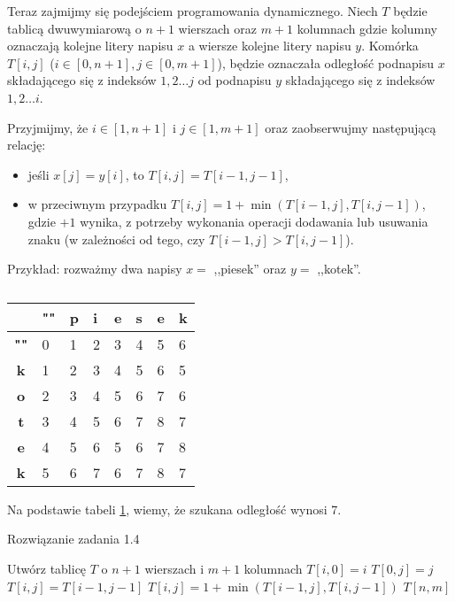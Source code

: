Teraz zajmijmy się podejściem programowania dynamicznego.
Niech $T$ będzie tablicą dwuwymiarową o
$n + 1$ wierszach oraz $m + 1$ kolumnach
gdzie kolumny oznaczają kolejne litery napisu $x$ a
wiersze kolejne litery napisu $y$. Komórka
$T[i, j]$ ($i \in [0, n+1], j \in [0, m+1]$), będzie 
oznaczała odległość 
podnapisu $x$ składającego się z indeksów $1,2 \ldots j$ od 
podnapisu $y$ składającego się z indeksów $1,2 \ldots i$.

Przyjmijmy, że $i \in [1, n+1]$ i $ j \in [1, m+1]$ oraz 
zaobserwujmy następującą relację: 
\begin{itemize}
	\item jeśli $x[j]=y[i]$, to $T[i, j] = T[i - 1, j - 1]$,
	\item w przeciwnym przypadku $T[i, j] = 1 + \min(T[i - 1, j], T[i, j - 1])$, gdzie
	$+1$ wynika, z potrzeby wykonania operacji dodawania lub usuwania znaku
	(w zależności od tego, czy $T[i - 1, j] > T[i, j - 1]$).
\end{itemize}

Przykład: rozważmy dwa napisy $x =$ ,,piesek'' oraz $y =$ ,,kotek''.

\begin{table}[H]
	\center
	\begin{tabular}{|c|lllllll|}
		\hline \diagbox{$y$}{$x$}
		& \multicolumn{1}{l|}{\textbf{""}} & \multicolumn{1}{l|}{\textbf{p}} & \multicolumn{1}{l|}{\textbf{i}} & \multicolumn{1}{l|}{\textbf{e}} & \multicolumn{1}{l|}{\textbf{s}} & \multicolumn{1}{l|}{\textbf{e}} & \multicolumn{1}{l|}{\textbf{k}} \\ \hline
		\textbf{""} & 0 & 1 & 2 & 3 & 4 & 5 & 6 \\ \cline{1-1}
		\textbf{k}  & 1 & 2 & 3 & 4 & 5 & 6 & 5 \\ \cline{1-1}
		\textbf{o}  & 2 & 3 & 4 & 5 & 6 & 7 & 6 \\ \cline{1-1}
		\textbf{t}  & 3 & 4 & 5 & 6 & 7 & 8 & 7 \\ \cline{1-1}
		\textbf{e}  & 4 & 5 & 6 & 5 & 6 & 7 & 8 \\ \cline{1-1}
		\textbf{k}  & 5 & 6 & 7 & 6 & 7 & 8 & 7 \\ \cline{1-1}
		\hline
	\end{tabular}
	\caption{}
	\label{tab_zad14}
\end{table}

Na podstawie tabeli \ref{tab_zad14}, wiemy, że szukana odległość wynosi 7.

\begin{algorithm}[H]
	\caption{Rozwiązanie zadania 1.4}
	\begin{algorithmic}[1]
		\State Utwórz tablicę $T$ o $n + 1$ wierszach i $m + 1$ kolumnach
		\State $T[i, 0] = i$
		\EndFor		
		\State $T[0, j] = j$
		\EndFor
		\State $T[i, j] = T[i - 1, j - 1]$
		\Else
		\State $T[i, j] = 1 + \min(T[i - 1, j], T[i, j - 1])$
		\EndIf
		\EndFor
		\EndFor
		\State \Return $T[n, m]$
		\EndProcedure 
	\end{algorithmic}
	\label{Zadanie14}
\end{algorithm}

